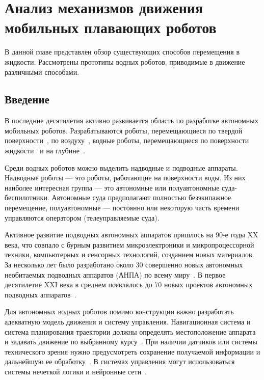 \chapter{Анализ механизмов движения мобильных плавающих роботов}\label{ch:ch1}

В данной главе представлен обзор существующих способов перемещения в жидкости. Рассмотрены прототипы водных роботов, приводимые в движение различными способами. 

\section{Введение}\label{sec:ch1/sec1}

В последние десятилетия активно развивается область по разработке автономных мобильных роботов. %
Разрабатываются роботы, перемещающиеся по твердой поверхности~\cite{Lozano_2012, Domel_2017, Kilin_et_al_2017, Bozek_2020}, по воздуху~\cite{Kim_2008, Miller_2007}, водные роботы, перемещающиеся по поверхности жидкости~\cite{Pshihopov_2014, Moreira_2011} и на глубине~\cite{Pshihopov_2014, Gornak_MMT3000, Matvienko_2017}. 

Среди водных роботов можно выделить надводные и подводные аппараты. Надводные роботы --- это роботы, работающие на поверхности воды. Из них наиболее интересная группа --- это автономные или полуавтономные суда-беспилотники. Автономные суда предполагают полностью безэкипажное перемещение, полуавтономные --- постоянно или некоторую часть времени управляются оператором (телеуправляемые суда).

Активное развитие подводных автономных аппаратов пришлось на 90-е годы XX века, что совпало с бурным развитием микроэлектроники и микропроцессорной техники, компьютерных и сенсорных технологий, созданием новых материалов. За несколько лет было разработано около 30 совершенно новых автономных необитаемых подводных аппаратов (АНПА) по всему миру~\cite{Yuh_2000}. В первое десятилетие XXI века в среднем появлялось до 70 новых проектов автономных подводных аппаратов~\cite{Bocharov_2009}.

Для автономных водных роботов помимо конструкции важно разработать адекватную модель движения и систему управления. Навигационная система и система планирования траектории должны определять местоположение аппарата и задавать движение по выбранному курсу~\cite{Fiorelli_2006, Lapierre_2007, Burdinskiy_2012}. При наличии датчиков или системы технического зрения нужно предусмотреть сохранение получаемой информации и дальнейшую ее обработку~\cite{Huster_2001, Dunbabin_2006}. В системах управления могут использоваться системы нечеткой логики и нейронные сети~\cite{Tenenev_2010, Loebis_2004, Ishii_1995, Xiang_2017, Zhang_2008}.

